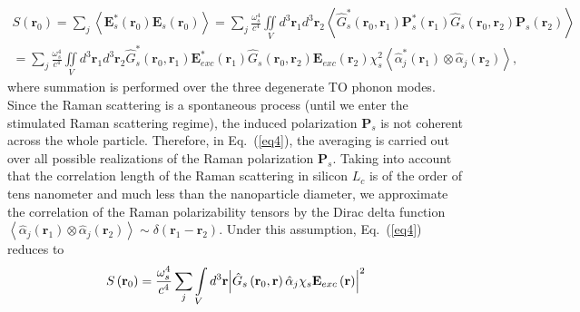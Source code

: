         \begin{align} %
            S\left( {{{\mathbf{r}}_0}} \right)
                =  \sum\limits_j {\left \langle{{\mathbf{E}}_s^*\left( {{{\mathbf{r}}_0}} \right){{\mathbf{E}}_s}\left( {{{\mathbf{r}}_0}} \right)} \right\rangle}
                = \sum\limits_j {\frac{{\omega _s^4}}{{{c^4}}}\iint\limits_V {{d^3}{{\mathbf{r}}_1}{d^3}{{\mathbf{r}}_2}\left\langle {\hat G_s^*\left( {{{\mathbf{r}}_0},{{\mathbf{r}}_1}} \right){\mathbf{P}}_s^*\left( {{{\mathbf{r}}_1}} \right){{\hat G}_s}\left( {{{\mathbf{r}}_0},{{\mathbf{r}}_2}} \right){{\mathbf{P}}_s}\left( {{{\mathbf{r}}_2}} \right)} \right\rangle }}  \\
                = \sum\limits_j {\frac{{\omega _s^4}}{{{c^4}}}\iint\limits_V {{d^3}{{\mathbf{r}}_1}{d^3}{{\mathbf{r}}_2}\hat G_s^*\left( {{{\mathbf{r}}_0},{{\mathbf{r}}_1}} \right){\mathbf{E}}_{exc}^*\left( {{{\mathbf{r}}_1}} \right){{\hat G}_s}\left( {{{\mathbf{r}}_0},{{\mathbf{r}}_2}} \right){{\mathbf{E}}_{exc}}\left( {{{\mathbf{r}}_2}} \right)\chi _s^2\left\langle {\hat \alpha _j^*\left( {{{\mathbf{r}}_1}} \right) \otimes {{\hat \alpha }_j}\left( {{{\mathbf{r}}_2}} \right)} \right\rangle }},
            \label{eq4}
        \end{align}
        where summation is performed over the three degenerate TO phonon modes. Since the Raman scattering is a spontaneous process
        (until we enter the stimulated Raman scattering regime), the  induced polarization $\mathbf{P}_s$ is not coherent across
        the whole particle. Therefore, in Eq.~(\ref{eq4}), the averaging is carried out over all possible realizations of the Raman
        polarization $\mathbf{P}_s$. Taking into account that the correlation length of the Raman scattering in silicon $L_c$ is of
        the order of tens nanometer and much less than the nanoparticle diameter, we approximate the correlation of the Raman
        polarizability tensors by the Dirac delta function
        $\left\langle {\hat \alpha_j \left( {{{\mathbf{r}}_1}} \right) \otimes \hat \alpha_j \left( {{{\mathbf{r}}_2}} \right)} \right\rangle \sim \delta \left({{\mathbf{r}_1} - {\mathbf{r}_2}} \right)$.
        Under this assumption, Eq.~(\ref{eq4}) reduces to
        \begin{align}
            S\left( {{{\bf{r}}_0}} \right) = \frac{{\omega _s^4}}{{{c^4}}}\sum\limits_j {\int\limits_V {{d^3}{\bf{r}}{{\left| {{{\hat G}_s}\left(
            {{{\bf{r}}_0},{\bf{r}}} \right){{\hat \alpha }_j}{\chi _s}{{\bf{E}}_{exc}}\left( {\bf{r}} \right)} \right|}^2}} }
            \label{eq5}
        \end{align}
